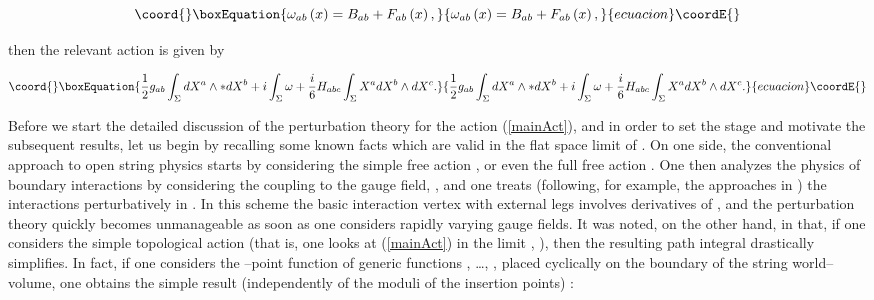 \documentclass[a4paper,11pt]{article}
\begin{document}
\begin{equation}\coord{}\boxEquation{
\omega_{ab}\left( x\right) = B_{ab}+F_{ab}\left( x\right) ,
\label{omega}
}{
\omega_{ab}\left( x\right) = B_{ab}+F_{ab}\left( x\right) ,
}{ecuacion}\coordE{}\end{equation}

\noindent
then the relevant action is given by 

\begin{equation}\coord{}\boxEquation{
\frac{1}{2}g_{ab} \int_{\Sigma } dX^{a} \wedge \ast dX^{b} + i \int_{\Sigma}
\omega + \frac{i}{6} H_{abc} \int_{\Sigma} X^{a} dX^{b} \wedge dX^{c}.
\label{mainAct}
}{
\frac{1}{2}g_{ab} \int_{\Sigma } dX^{a} \wedge \ast dX^{b} + i \int_{\Sigma}
\omega + \frac{i}{6} H_{abc} \int_{\Sigma} X^{a} dX^{b} \wedge dX^{c}.
}{ecuacion}\coordE{}\end{equation}

Before we start the detailed discussion of the perturbation theory for the
action (\ref{mainAct}), and in order to set the stage and motivate the
subsequent results, let us begin by recalling some known facts which are 
valid in the flat space limit of \coordHE{}. On one side, the conventional 
approach to open string physics starts by considering the simple free action 
\coordHE{}, or even the full 
free action \coordHE{}. One then analyzes the physics of boundary interactions by
considering the coupling \coordHE{} to the \coordHE{} gauge field, \coordHE{}, and one
treats (following, for example, the approaches in \cite{Fradkin-Tseytlin, 
ACNY, CLNY}) the interactions perturbatively in \coordHE{}. In this scheme the 
basic interaction vertex with \coordHE{} external legs involves \coordHE{} derivatives of 
\coordHE{}, and the perturbation theory quickly becomes unmanageable as soon as one 
considers rapidly varying gauge fields. It was noted, on the other hand, in 
\cite{Cattaneo-Felder} that, if one considers the simple topological action \coordHE{} (that is, one looks at (\ref{mainAct}) in the limit 
\coordHE{}, \coordHE{}), then the resulting path integral drastically 
simplifies. In fact, if one considers the \coordHE{}--point function of \coordHE{} generic 
functions \coordHE{}, \ldots, \coordHE{}, placed 
cyclically on the boundary \myHighlight{$\partial \Sigma$}\coordHE{} of the string world--volume, one 
obtains the simple result (independently of the moduli of the insertion 
points) \cite{Cattaneo-Felder,Seiberg-Witten}: 
\end{document}
